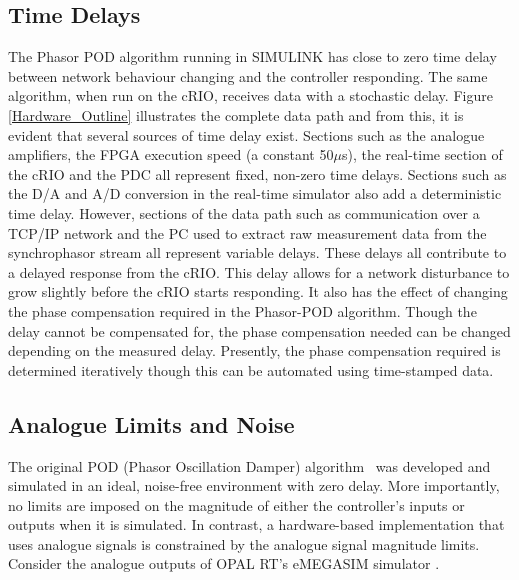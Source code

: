 \documentclass[journal]{IEEEtran}
\begin{document}
\subsection{Time Delays}

The Phasor POD algorithm running in SIMULINK has close to zero time delay between network behaviour changing and the controller responding. The same algorithm, when run on the cRIO, receives data with a stochastic delay. Figure \ref{Hardware_Outline} illustrates the complete data path and from this, it is evident that several sources of time delay exist. Sections such as the analogue amplifiers, the FPGA execution speed (a constant 50$\mu$s), the real-time section of the cRIO and the PDC all represent fixed, non-zero time delays. Sections such as the D/A and A/D conversion in the real-time simulator also add a deterministic time delay. However, sections of the data path such as communication over a TCP/IP network and the PC used to extract raw measurement data from the synchrophasor stream all represent variable delays. These delays all contribute to a delayed response from the cRIO. This delay allows for a network disturbance to grow slightly before the cRIO starts responding. It also has the effect of changing the phase compensation required in the Phasor-POD algorithm. Though the delay cannot be compensated for, the phase compensation needed can be changed depending on the measured delay. Presently, the phase compensation required is determined iteratively though this can be automated using time-stamped data.\\


\subsection{Analogue Limits and Noise}
The original POD (Phasor Oscillation Damper) algorithm~\cite{PhasorPOD} was developed and simulated in an ideal, noise-free environment with zero delay. More importantly, no limits are imposed on the magnitude of either the controller's inputs or outputs when it is simulated. In contrast, a hardware-based implementation that uses analogue signals is constrained by the analogue signal magnitude limits.\\

Consider the analogue outputs of OPAL RT's eMEGASIM simulator \cite{OPALemegasim}.
\end{document}
